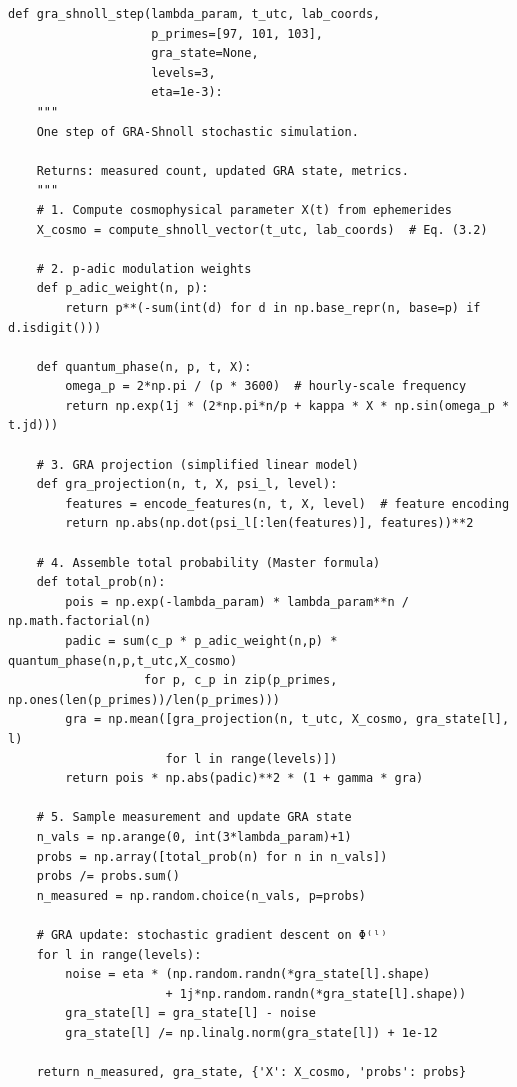 \documentclass[12pt,a4paper]{article}
\theoremstyle{plain}
\theoremstyle{definition}
\theoremstyle{remark}
\begin{document}
\begin{lstlisting}[caption={Simulation core: one GRA-Shnoll step}, label={lst:core-algorithm}]
def gra_shnoll_step(lambda_param, t_utc, lab_coords, 
                    p_primes=[97, 101, 103], 
                    gra_state=None, 
                    levels=3, 
                    eta=1e-3):
    """
    One step of GRA-Shnoll stochastic simulation.
    
    Returns: measured count, updated GRA state, metrics.
    """
    # 1. Compute cosmophysical parameter X(t) from ephemerides
    X_cosmo = compute_shnoll_vector(t_utc, lab_coords)  # Eq. (3.2)
    
    # 2. p-adic modulation weights
    def p_adic_weight(n, p):
        return p**(-sum(int(d) for d in np.base_repr(n, base=p) if d.isdigit()))
    
    def quantum_phase(n, p, t, X):
        omega_p = 2*np.pi / (p * 3600)  # hourly-scale frequency
        return np.exp(1j * (2*np.pi*n/p + kappa * X * np.sin(omega_p * t.jd)))
    
    # 3. GRA projection (simplified linear model)
    def gra_projection(n, t, X, psi_l, level):
        features = encode_features(n, t, X, level)  # feature encoding
        return np.abs(np.dot(psi_l[:len(features)], features))**2
    
    # 4. Assemble total probability (Master formula)
    def total_prob(n):
        pois = np.exp(-lambda_param) * lambda_param**n / np.math.factorial(n)
        padic = sum(c_p * p_adic_weight(n,p) * quantum_phase(n,p,t_utc,X_cosmo) 
                   for p, c_p in zip(p_primes, np.ones(len(p_primes))/len(p_primes)))
        gra = np.mean([gra_projection(n, t_utc, X_cosmo, gra_state[l], l) 
                      for l in range(levels)])
        return pois * np.abs(padic)**2 * (1 + gamma * gra)
    
    # 5. Sample measurement and update GRA state
    n_vals = np.arange(0, int(3*lambda_param)+1)
    probs = np.array([total_prob(n) for n in n_vals])
    probs /= probs.sum()
    n_measured = np.random.choice(n_vals, p=probs)
    
    # GRA update: stochastic gradient descent on Φ⁽ˡ⁾
    for l in range(levels):
        noise = eta * (np.random.randn(*gra_state[l].shape) 
                      + 1j*np.random.randn(*gra_state[l].shape))
        gra_state[l] = gra_state[l] - noise
        gra_state[l] /= np.linalg.norm(gra_state[l]) + 1e-12
    
    return n_measured, gra_state, {'X': X_cosmo, 'probs': probs}
\end{lstlisting}
\end{document}

